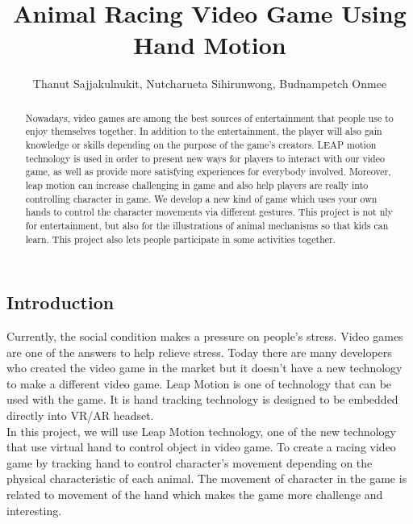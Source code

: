 \documentclass[12pt, oneside]{article}										%
\title{Animal Racing Video Game Using Hand Motion}
\author{Thanut Sajjakulnukit, Nutcharueta Sihirunwong, Budnampetch Onmee}
\begin{document}
    \maketitle														        %
    \begin{multicols*}{2}
    \twocolumn
    \begin{abstract}                                                        %
        Nowadays, video games are among the best sources of 
        entertainment that people use to enjoy themselves together.
            In addition to the entertainment, the player will also gain 
            knowledge or skills depending on the purpose of the game’s 
            creators.   LEAP motion technology is used in order to 
            present new ways for players to interact with our video 
            game, as well as provide more satisfying experiences for 
            everybody involved. Moreover, leap motion can increase 
            challenging in game and also help players are really into 
            controlling character in game. We  develop a new kind of 
            game which uses your own hands to control the character 
            movements via different gestures. This project is not 
            nly for entertainment, but also for the illustrations 
            of animal mechanisms so that kids can learn. This 
            project also lets people participate in some 
            activities together.

    \end{abstract}

    \section{Introduction}                                                  %
    Currently, the social condition makes a pressure on people’s 
    stress. Video games are one of the answers to help relieve 
    stress. Today there are many developers who created the video 
    game in the market but it doesn't have a new technology to make 
    a different video game. Leap Motion is one of technology that 
    can be used with the game. It is hand tracking technology is 
    designed to be embedded directly into VR/AR headset. \\

    In this project, we will use Leap Motion technology, one of
    the new technology that use virtual hand to control object
    in video game. To create a racing video game by tracking 
    hand to control character’s movement depending on the 
    physical characteristic of each animal. The movement of 
    character in the game is related to movement of the hand 
    which makes the game more challenge and interesting.
    

\end{multicols*}
\end{document}
